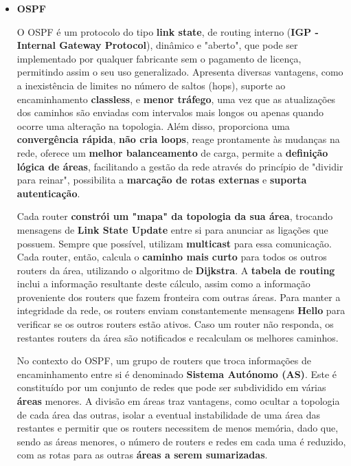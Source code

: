 \documentclass[11pt,english, openright, oneside]{book}
\begin{document}
\begin{itemize}
  \item \textbf{OSPF}
  \vspace{0.2cm}
  \par O OSPF é um protocolo do tipo \textbf{link state}, de routing interno (\textbf{IGP - Internal Gateway Protocol}), dinâmico e "aberto", que pode ser implementado por qualquer fabricante sem o pagamento de licença, permitindo assim o seu uso generalizado. Apresenta diversas vantagens, como a inexistência de limites no número de saltos (hops), suporte ao encaminhamento \textbf{classless}, e \textbf{menor tráfego}, uma vez que as atualizações dos caminhos são enviadas com intervalos mais longos ou apenas quando ocorre uma alteração na topologia. Além disso, proporciona uma \textbf{convergência rápida}, \textbf{não cria loops}, reage prontamente às mudanças na rede, oferece um \textbf{melhor balanceamento} de carga, permite a \textbf{definição lógica de áreas}, facilitando a gestão da rede através do princípio de "dividir para reinar", possibilita a \textbf{marcação de rotas externas} e \textbf{suporta autenticação}.
  \vspace{0.2cm}

  Cada router \textbf{constrói um "mapa" da topologia da sua área}, trocando mensagens de \textbf{Link State Update} entre si para anunciar as ligações que possuem. Sempre que possível, utilizam \textbf{multicast} para essa comunicação. Cada router, então, calcula o \textbf{caminho mais curto} para todos os outros routers da área, utilizando o algoritmo de \textbf{Dijkstra}. A \textbf{tabela de routing} inclui a informação resultante deste cálculo, assim como a informação proveniente dos routers que fazem fronteira com outras áreas. Para manter a integridade da rede, os routers enviam constantemente mensagens \textbf{Hello} para verificar se os outros routers estão ativos. Caso um router não responda, os restantes routers da área são notificados e recalculam os melhores caminhos.
  \vspace{0.2cm}

  No contexto do OSPF, um grupo de routers que troca informações de encaminhamento entre si é denominado \textbf{Sistema Autónomo (AS)}. Este é constituído por um conjunto de redes que pode ser subdividido em várias \textbf{áreas} menores. A divisão em áreas traz vantagens, como ocultar a topologia de cada área das outras, isolar a eventual instabilidade de uma área das restantes e permitir que os routers necessitem de menos memória, dado que, sendo as áreas menores, o número de routers e redes em cada uma é reduzido, com as rotas para as outras \textbf{áreas a serem sumarizadas}.
  

\end{itemize}
\end{document}
